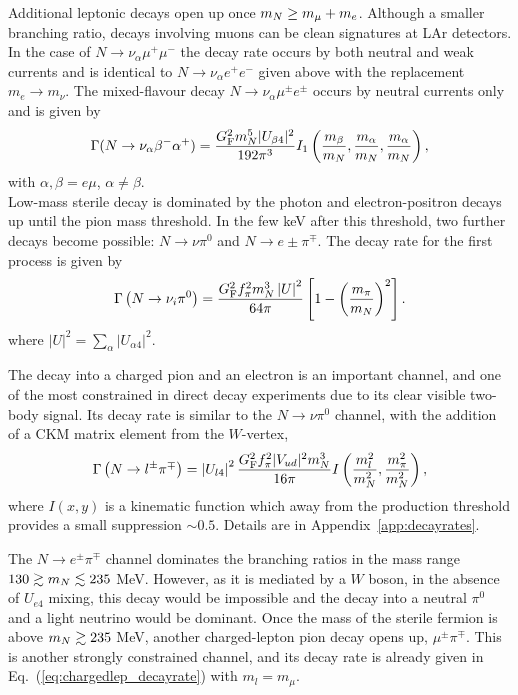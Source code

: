 \documentclass[11pt, a4paper]{article}
\newcommand{\refeq}[1]{Eq.~(\ref{#1})}
\newcommand{\refapp}[1]{Appendix~\ref{#1}}
\def\ster{\ensuremath N}
\begin{document}
Additional leptonic decays open up once $m_\ster \geq m_\mu+m_e$. Although a smaller branching ratio, decays involving muons can be clean signatures at LAr detectors. In the case of $N\rightarrow \nu_\alpha \mu^+ \mu^-$ the decay rate occurs by both neutral and weak currents and is identical to  $N\rightarrow \nu_\alpha e^+ e^-$ given above with the replacement $m_e \rightarrow m_\nu$. The mixed-flavour decay $N\rightarrow \nu_\alpha \mu^\pm e^\pm$ occurs by neutral currents only and is given by 
\[
	\Gamma(\ster\to\nu_{\alpha} \beta^- \alpha^+) = \frac{G_\text{F}^2m_\ster^5 |U_{\beta 4}|^2}{192 \pi^3} I_1\left(\frac{m_\beta}{m_N},\frac{ m_\alpha}{m_N}, \frac{ m_\alpha}{m_N} \right) ,
\]
with $\alpha,\beta = e \mu$, $\alpha \neq \beta$. \\

Low-mass sterile decay is dominated by the photon and electron-positron decays
up until the pion mass threshold. In the few keV after this threshold, two
further decays become possible: $N\to\nu \pi^0$ and $N\to e\pm\pi^\mp$. 
%
The decay rate for the first process is given by
%
\[ \Gamma\left(\ster \to \nu_i \pi^0\right) =
\frac{G_\text{F}^2f_\pi^2m_\ster^3\left|U\right|^2}{64\pi} \left[1-\left(
\frac{m_\pi}{m_\ster} \right)^2\right].  \]
%
where $\left|U\right|^2 = \sum_{\alpha}\left|U_{\alpha 4}\right|^2$.
%

The decay into a charged pion and an electron is an important channel, and one
of the most constrained in direct decay experiments due to its clear visible
two-body signal.  Its decay rate is similar to the $N\to \nu
\pi^0$ channel, with the addition of a CKM matrix element from the $W$-vertex,
%
\begin{align} \Gamma\left(\ster\to l^\pm\pi^\mp\right) =
\left|U_{l4}\right|^2\frac{G_\text{F}^2f_\pi^2 |V_{ud}|^2
m_\ster^3}{16\pi}I\left(\frac{m_l^2}{m_\ster^2} ,
\frac{m_\pi^2}{m_\ster^2}\right) , \label{eq:chargedlep_decayrate}\end{align}
%
where $I(x,y)$ is a kinematic function which away from the production threshold
provides a small suppression $\sim 0.5$. Details are in \refapp{app:decayrates}.

The $N\to e^\pm\pi^\mp$ channel dominates the branching ratios in the mass
range $130 \gtrsim m_\ster  \lesssim 235$ MeV. However, as it is mediated by a
$W$ boson, in the absence of $U_{e4}$ mixing, this decay would be impossible
and the decay into a neutral $\pi^0$ and a light neutrino would be dominant.
Once the mass of the sterile fermion is above $m_\ster \gtrsim 235$ MeV,
another charged-lepton pion decay opens up, $\mu^\pm\pi^\mp$. This is another
strongly constrained channel, and its decay rate is already given in
\refeq{eq:chargedlep_decayrate} with $m_l = m_\mu$. 
\end{document}
